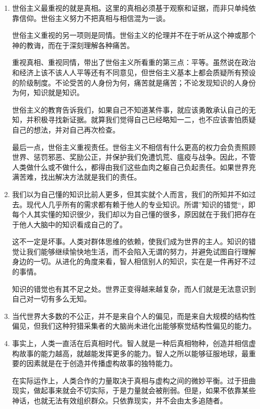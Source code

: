 \documentclass[UTF8]{ctexart}
\begin{document}
\begin{enumerate}
			\item  世俗主义最重视的就是真相。这里的真相必须基于观察和证据，而非只单纯依靠信仰。世俗主义努力不把真相与相信混为一谈。
			
			世俗主义重视的另一项则是同情。世俗主义的伦理并不在于听从这个神或那个神的教诲，而在于深刻理解各种痛苦。
			
			重视真相、重视同情，带出了世俗主义所看重的第三点：平等。虽然说在政治和经济上该不该人人平等还有不同意见，但世俗主义基本上都会质疑所有预设的阶级制度。不论受苦的人身份为何，痛苦就是痛苦；不论发现知识的人身份为何，知识就是知识。
			
			世俗主义的教育告诉我们，如果自己不知道某件事，就应该勇敢承认自己的无知，并积极寻找新证据。就算我们觉得自己已经略知一二，也不应该害怕质疑自己的想法，并对自己再次检查。
			
			最后一点，世俗主义重视责任。世俗主义不相信有什么更高的权力会负责照顾世界、惩罚邪恶、奖励公正，并保护我们免遭饥荒、瘟疫与战争。因此，不管人类做什么或不做什么，都得由我们这些血肉之躯自己负起责任。如果世界充满苦难，找出解决方法就是我们的责任。
			
			\item  我们以为自己懂的知识比前人更多，但其实就个人而言，我们的所知并不如过去。现代人几乎所有的需求都有赖于他人的专业知识。所谓”知识的错觉“，即每个人其实懂的知识很少，我们却以为自己懂的很多，原因就在于我们把存在于他人大脑中的知识看成自己的了。
			
			这不一定是坏事。人类对群体思维的依赖，使我们成为世界的主人。知识的错觉让我们能够继续愉快地生活，而不会陷入无谓的努力，并避免试图自行理解身边的一切。从进化的角度来看，智人相信别人的知识，实在是一件再好不过的事情。
			
			知识的错觉也有其不足之处。世界正变得越来越复杂，而人们就是无法意识到自己对一切有多么无知。
			
			\item  当代世界大多数的不公正，并不是来自个人的偏见，而是来自大规模的结构性偏见，但我们这种狩猎采集者的大脑尚未进化出能够察觉结构性偏见的能力。
			
			\item  事实上，人类一直活在后真相时代。智人就是一种后真相物种，创造并相信虚构故事的能力越高，就越能发挥更多的能力。智人之所以能够征服地球，最重要的因素就是在于创造并传播虚构故事的独特能力。
			
			在实际运作上，人类合作的力量取决于真相与虚构之间的微妙平衡。过于扭曲现实，做起事来就会不切实际，于是力量就会被削弱。但是，如果不依靠某些神话，也就无法有效组织群众。只依靠现实，并不会由太多追随者。
			

\end{enumerate}
\end{document}
